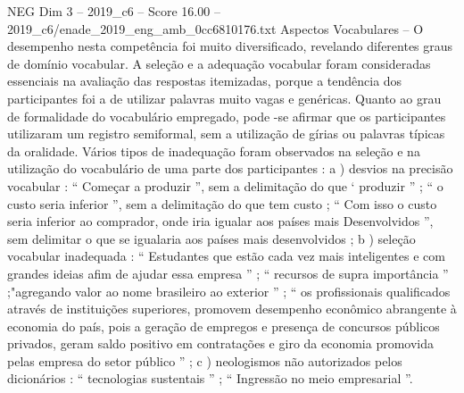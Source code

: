 \begin{textsample}{NEG Dim 3 – 2019\_c6 – Score 16.00 – 2019\_c6/enade\_2019\_eng\_amb\_0cc6810176.txt}
Aspectos Vocabulares – O desempenho nesta competência foi muito diversificado, revelando diferentes graus de domínio vocabular.
A seleção e a adequação vocabular foram consideradas essenciais na avaliação das respostas itemizadas, porque a tendência dos participantes foi a de utilizar palavras muito vagas e genéricas.
Quanto ao grau de formalidade do vocabulário empregado, pode -se afirmar que os participantes utilizaram um registro semiformal, sem a utilização de gírias ou palavras típicas da oralidade.
Vários tipos de inadequação foram observados na seleção e na utilização do vocabulário de uma parte dos participantes : a ) desvios na precisão vocabular : “ Começar a produzir ”, sem a delimitação do que ‘ produzir ” ; “ o custo seria inferior ”, sem a delimitação do que tem custo ; “ Com isso o custo seria inferior ao comprador, onde iria igualar aos países mais Desenvolvidos ”, sem delimitar o que se igualaria aos países mais desenvolvidos ; b ) seleção vocabular inadequada : “ Estudantes que estão cada vez mais inteligentes e com grandes ideias afim de ajudar essa empresa ” ; “ recursos de supra importância ” ;"agregando valor ao nome brasileiro ao exterior ” ; “ os profissionais qualificados através de instituições superiores, promovem desempenho econômico abrangente à economia do país, pois a geração de empregos e presença de concursos públicos privados, geram saldo positivo em contratações e giro da economia promovida pelas empresa do setor público ” ; c ) neologismos não autorizados pelos dicionários : “ tecnologias sustentais ” ; “ Ingressão no meio empresarial ”.

\end{textsample}
